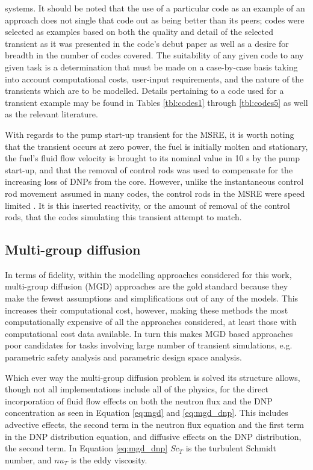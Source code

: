 \documentclass[review]{elsarticle}
\begin{document}
systems.
It should be noted that the use of a particular code as an example of an
approach does not single that code out as being better than its peers; codes
were selected as examples based on both the quality and detail of the selected
transient as it was presented in the code's debut paper as well as
a desire for breadth in the number of codes covered.
 The suitability of any given code to any given task
is a determination that must be made on a case-by-case basis taking into account
computational costs, user-input requirements, and the nature of the transients
which are to be modelled. Details pertaining
to a code used for a transient example may be found in Tables \ref{tbl:codes1}
through \ref{tbl:codes5} as
well as the relevant literature.
\par With regards to the pump start-up transient for the MSRE, it is worth noting
that the transient occurs at zero power, the fuel is initially molten and
stationary, the fuel's fluid flow velocity is brought to its nominal value in
10 s by the pump start-up, and that the removal of control rods was used to
compensate for the increasing loss of DNPs from the core. However, 
unlike the instantaneous control rod movement assumed in many codes, 
the control rods in the
MSRE were speed limited \cite{krepel_dyn3d-msr_2007}. It is this inserted
reactivity, or the amount of removal of the control rods, that the codes simulating
this transient attempt to match.

\subsection{Multi-group diffusion} \label{ssec:mgd}
In terms of fidelity, within the modelling approaches considered for this
work, multi-group diffusion (MGD) approaches are the gold standard because they
make the fewest assumptions and simplifications out of any of the models.
This increases their computational cost, however, making these methods
the most computationally expensive of all the approaches considered, at least
those with computational cost data available. In turn this makes MGD based
approaches poor candidates for tasks involving large number of transient
simulations, e.g. parametric safety analysis and parametric design space
analysis. 
\par Which ever way the multi-group
diffusion problem is solved its structure allows, though not all implementations
include all of the physics, for the direct incorporation
of fluid flow effects on both the neutron flux and the DNP concentration as
seen in Equation \ref{eq:mgd} and \ref{eq:mgd_dnp}.
This includes advective effects, the second term in the neutron flux equation 
 and the first term in the DNP distribution equation, and diffusive effects on
 the DNP distribution, the second term. In Equation \ref{eq:mgd_dnp}
 $Sc_{T}$ is the turbulent Schmidt number, and $nu_{T}$ is the eddy viscosity. 
\end{document}
